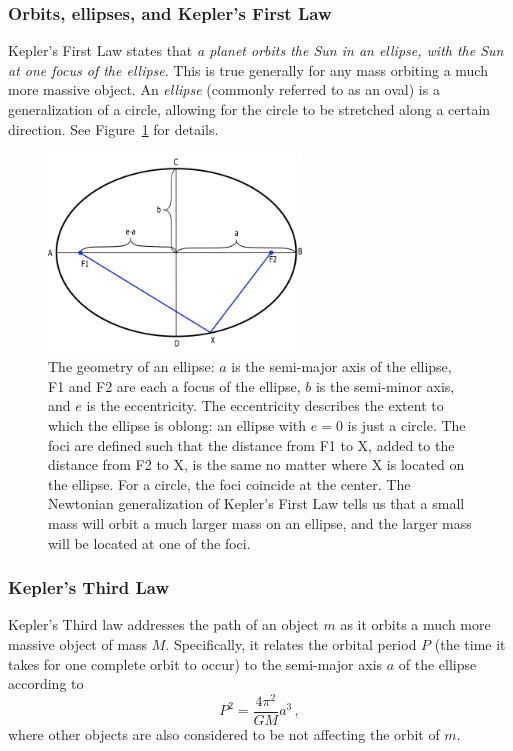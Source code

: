 \subsubsection{Orbits, ellipses, and Kepler's First Law}
Kepler's First Law states that \textit{a planet orbits the Sun in an ellipse, with the Sun at one focus of the ellipse}. This is true generally for any mass orbiting a much more massive object. An \textit{ellipse} (commonly referred to as an oval) is a generalization of a circle, allowing for the circle to be stretched along a certain direction. See Figure~\ref{gc:fig:ellipse} for details.

\begin{figure}
	\centering
	\includegraphics[width=0.6\textwidth]{galactic-center/ellipse.png}
	\caption{The geometry of an ellipse: $a$ is the semi-major axis of the ellipse, F1 and F2 are each a
		focus of the ellipse, $b$ is the semi-minor axis, and $e$ is the eccentricity. The eccentricity describes
		the extent to which the ellipse is oblong: an ellipse with $e = 0$ is just a circle. The foci are defined such
		that the distance from F1 to X, added to the distance from F2 to X, is the same no matter where X
		is located on the ellipse. For a circle, the foci coincide at the center. The Newtonian generalization of
		Kepler's First Law tells us that a small mass will orbit a much larger mass on an ellipse, and the larger
		mass will be located at one of the foci.}\label{gc:fig:ellipse}
\end{figure}

\subsubsection{Kepler's Third Law}

Kepler’s Third law addresses the path of an object $m$ as it orbits a much more massive object of mass $M$. Specifically, it relates the orbital period $P$ (the time it takes for one complete orbit to occur) to the semi-major axis $a$ of the ellipse according to
\begin{equation}\label{gc:eq:kepler-3}
P^2 = \frac{4 \pi^2}{G M} a^3 \,,
\end{equation}
where other objects are also considered to be not affecting the orbit of $m$. %

